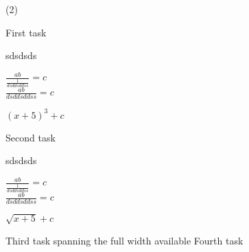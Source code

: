 \begin{tasks}[resume](2)
    \task 
          \begin{exercise}[resume] First task  
  \begin{envSolution}
 
      sdsdsds


          
   $ \frac{ab}{ \frac{1} { dsdds d ds s  }}=c  $\\
   $ \frac{ab}{dsdds d ds s}=c  $\\
      
  
  \begin{shortsolution}
  	$ (x+5)^3+c $
  \end{shortsolution}
  \end{envSolution}%
 \end{exercise}
 
    \task Second task
\begin{exercise}
	
    
  \begin{envSolution}
 
      sdsdsds


          
   $ \frac{ab}{ \frac{1} { dsdds d ds s  }}=c  $\\
   $ \frac{ab}{dsdds d ds s}=c  $\\
      
  \begin{shortsolution}
  	$ \sqrt{x+5}+c $
  \end{shortsolution}
  
  \end{envSolution}%

\end{exercise}

 
    \task Third task spanning the full width available
    \task Fourth task
 \end{tasks}











